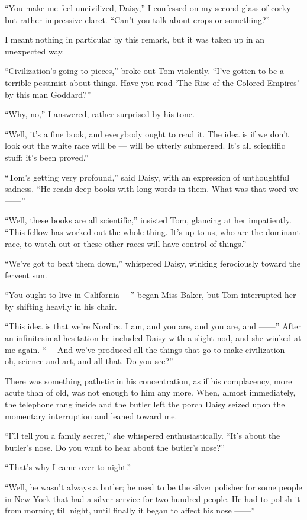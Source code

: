 \documentclass{znotebook}
\begin{document}
``You make me feel uncivilized, Daisy,'' I confessed on my second glass of corky but rather impressive claret. ``Can’t you talk about crops or something?''

I meant nothing in particular by this remark, but it was taken up in an unexpected way.

``Civilization’s going to pieces,'' broke out Tom violently. ``I’ve gotten to be a terrible pessimist about things. Have you read ‘The Rise of the Colored Empires’ by this man Goddard?''

``Why, no,'' I answered, rather surprised by his tone.

``Well, it’s a fine book, and everybody ought to read it. The idea is if we don’t look out the white race will be — will be utterly submerged. It’s all scientific stuff; it’s been proved.''

``Tom’s getting very profound,'' said Daisy, with an expression of unthoughtful sadness. ``He reads deep books with long words in them. What was that word we ——''

``Well, these books are all scientific,'' insisted Tom, glancing at her impatiently. ``This fellow has worked out the whole thing. It’s up to us, who are the dominant race, to watch out or these other races will have control of things.''

``We’ve got to beat them down,'' whispered Daisy, winking ferociously toward the fervent sun.

``You ought to live in California —'' began Miss Baker, but Tom interrupted her by shifting heavily in his chair.

``This idea is that we’re Nordics. I am, and you are, and you are, and ——'' After an infinitesimal hesitation he included Daisy with a slight nod, and she winked at me again. ``— And we’ve produced all the things that go to make civilization — oh, science and art, and all that. Do you see?''

There was something pathetic in his concentration, as if his complacency, more acute than of old, was not enough to him any more. When, almost immediately, the telephone rang inside and the butler left the porch Daisy seized upon the momentary interruption and leaned toward me.

``I’ll tell you a family secret,'' she whispered enthusiastically. ``It’s about the butler’s nose. Do you want to hear about the butler’s nose?''

``That’s why I came over to-night.''

``Well, he wasn’t always a butler; he used to be the silver polisher for some people in New York that had a silver service for two hundred people. He had to polish it from morning till night, until finally it began to affect his nose ——''
\end{document}
